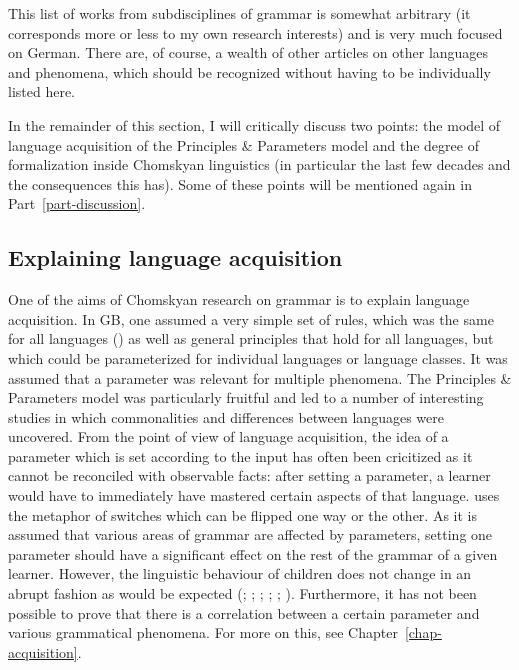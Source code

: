 This list of works from subdisciplines of grammar is somewhat arbitrary (it corresponds more or less to my own
research interests) and is very much focused on German. There are, of course, a wealth of other articles on other
languages and phenomena, which should be recognized without having to be individually listed here.

In the remainder of this section, I will critically discuss two points: the model of language acquisition of the Principles
\& Parameters model and the degree of formalization inside Chomskyan linguistics (in particular the last few decades
and the consequences this has). Some of these points will be mentioned again in Part~\ref{part-discussion}. 

\subsection{Explaining language acquisition}
\label{sec-acquisition-gb}

One of the aims of Chomskyan research on grammar is to explain language acquisition. In GB, one
assumed a very simple set of rules, which was the same for all languages (\xbart) as well as
general principles that hold for all languages, but which could be parameterized for individual
languages or language classes. It was assumed that a parameter was relevant for multiple phenomena.
The Principles \& Parameters model was particularly fruitful and led to a number of interesting
studies in which commonalities and differences between languages were uncovered. From the point of
view of language acquisition, the idea of a parameter which is set according to the input has often
been cricitized as it cannot be reconciled with observable facts: after setting a parameter, a
learner would have to immediately have mastered certain aspects of that language. \citet[]{Chomsky86} uses the metaphor of switches which can be flipped one way or the other. As it is
assumed that various areas of grammar are affected by parameters, setting one parameter should have
a significant effect on the rest of the grammar of a given learner.  However, the linguistic
behaviour of children does not change in an abrupt fashion as would be expected (\citealp[]{Bloom93a}; \citealp[]{Haider93a}; \citealp[]{Abney96a};
\citealp[Section~9.1]{AW98a}; \citealp{Tomasello2000a,Tomasello2003a};
\citealp{Newmeyer2005a}).  Furthermore, it has not been possible to prove that there is
a correlation between a certain parameter and various grammatical phenomena. For more on this, see
Chapter~\ref{chap-acquisition}.


